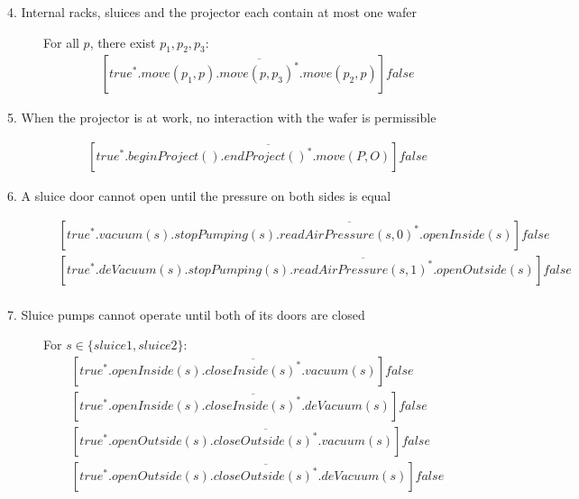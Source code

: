 \begin{description}
 
 \item[4. Internal racks, sluices and the projector each contain at most one wafer]
    
    For all $p$, there exist $p_1, p_2, p_3$:
	\begin{align*}
		&[true^*.move(p_1, p).\overline{move(p,p_3)^*}.move(p_2,p)]false
	\end{align*}

 
 \item[5. When the projector is at work, no interaction with the wafer is permissible]
 	\begin{align*}
 		&[true^*.beginProject().\overline{endProject()^*}.move(P,O)]false
	\end{align*}
	
 \item[6. A sluice door cannot open until the pressure on both sides is equal]
	\begin{align*}
		&[true^*.vacuum(s).stopPumping(s).\overline{readAirPressure(s,0)^*}.openInside(s)]false \\
		&[true^*.deVacuum(s).stopPumping(s).\overline{readAirPressure(s,1)^*}.openOutside(s)]false \\
	\end{align*}
	
 \item[7. Sluice pumps cannot operate until both of its doors are closed]
 
  For $s \in \{sluice1, sluice2\}:$
 \begin{align*}
		&[true^*.openInside(s).\overline{closeInside(s)^*}.vacuum(s)]false \\
		&[true^*.openInside(s).\overline{closeInside(s)^*}.deVacuum(s)]false \\
		&[true^*.openOutside(s).\overline{closeOutside(s)^*}.vacuum(s)]false \\
		&[true^*.openOutside(s).\overline{closeOutside(s)^*}.deVacuum(s)]false \\
	\end{align*}


\end{description}
